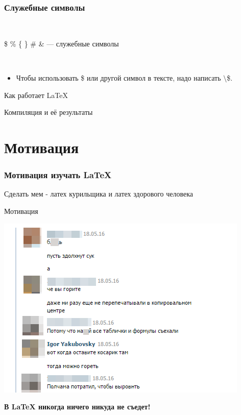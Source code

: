 \documentclass[newPxFont]{beamer}
\begin{document}

\begin{frame}
\frametitle{Служебные символы} 

\mbox{ } 

\centering
\Large{ \$ \% \{ \} \# \& --- служебные символы}

\mbox{ }

\begin{itemize}
\item \normalsize{Чтобы использовать \$ или другой символ в тексте, надо написать $\setminus$\$.}
\end{itemize}
\end{frame}

\begin{frame}{Как работает \LaTeX{}}

\end{frame}


\begin{frame}{Компиляция и её результаты}

\end{frame}



\section{Мотивация}

\begin{frame}\frametitle{Мотивация изучать \LaTeX{}} 
Сделать мем - латех курильщика и латех здорового человека
\end{frame}


\begin{frame}{Мотивация}

	\centering
    \includegraphics[height=0.7\textheight]{m1.png}
    
    
    \alert{\textbf{В \LaTeX{} никогда ничего никуда не съедет!}}
    
    
\end{frame}
\end{document}
